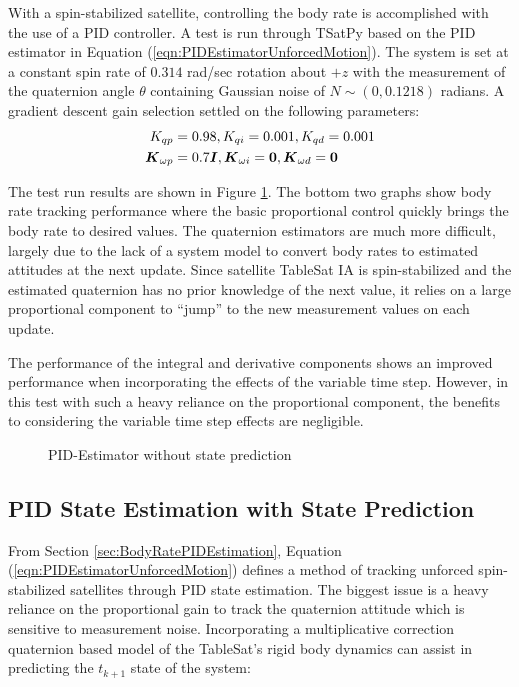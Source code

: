 With a spin-stabilized satellite, controlling the body rate is accomplished with the use of a PID controller.  A test is run through TSatPy based on the PID estimator in Equation (\ref{eqn:PIDEstimatorUnforcedMotion}).  The system is set at a constant spin rate of $0.314$ rad/sec rotation about $+z$ with the measurement of the quaternion angle $\theta$ containing Gaussian noise of $N \sim (0, 0.1218)$ radians.  A gradient descent gain selection settled on the following parameters:
\begin{equation}
  \begin{aligned}
    K_{qp} &= 0.98, K_{qi} = 0.001, K_{qd} = 0.001 \\
    \boldsymbol{K}_{\omega p} &= 0.7 \boldsymbol{I}, \boldsymbol{K}_{\omega i} = \boldsymbol{0}, \boldsymbol{K}_{\omega d} = \boldsymbol{0}
  \end{aligned}
\end{equation}

The test run results are shown in Figure \ref{fig:PIDEstimatorwithoutstateprediction}.  The bottom two graphs show body rate tracking performance where the basic proportional control quickly brings the body rate to desired values.  The quaternion estimators are much more difficult, largely due to the lack of a system model to convert body rates to estimated attitudes at the next update.  Since satellite TableSat IA is spin-stabilized and the estimated quaternion has no prior knowledge of the next value, it relies on a large proportional component to ``jump'' to the new measurement values on each update.

The performance of the integral and derivative components shows an improved performance when incorporating the effects of the variable time step.  However, in this test with such a heavy reliance on the proportional component, the benefits to considering the variable time step effects are negligible.

\begin{figure}[H]
  \centerline{}
  \caption{PID-Estimator without state prediction}
  \label{fig:PIDEstimatorwithoutstateprediction}
\end{figure}


\subsection{PID State Estimation with State Prediction}
\label{subsec:PIDEstimatorwithStatePrediction}

From Section \ref{sec:BodyRatePIDEstimation}, Equation (\ref{eqn:PIDEstimatorUnforcedMotion}) defines a method of tracking unforced spin-stabilized satellites through PID state estimation.  The biggest issue is a heavy reliance on the proportional gain to track the quaternion attitude which is sensitive to measurement noise.  Incorporating a multiplicative correction quaternion based model of the TableSat's rigid body dynamics can assist in predicting the $t_{k+1}$ state of the system:

